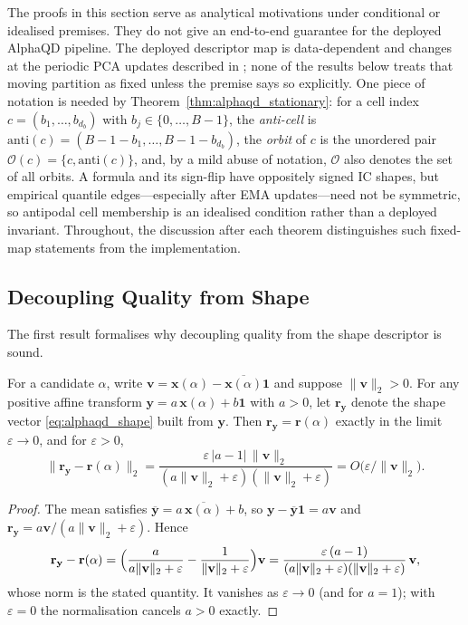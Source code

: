 The proofs in this section serve as analytical motivations under conditional or idealised premises. They do not give an end-to-end guarantee for the deployed AlphaQD pipeline. The deployed descriptor map is data-dependent and changes at the periodic PCA updates described in ; none of the results below treats that moving partition as fixed unless the premise says so explicitly. One piece of notation is needed by Theorem~\ref{thm:alphaqd_stationary}: for a cell index $c=(b_1,\dots,b_{d_b})$ with $b_j\in\{0,\dots,B-1\}$, the \emph{anti-cell} is $\mathrm{anti}(c)=(B-1-b_1,\dots,B-1-b_{d_b})$, the \emph{orbit} of $c$ is the unordered pair $\mathcal{O}(c)=\{c,\mathrm{anti}(c)\}$, and, by a mild abuse of notation, $\mathcal{O}$ also denotes the set of all orbits. A formula and its sign-flip have oppositely signed IC shapes, but empirical quantile edges---especially after EMA updates---need not be symmetric, so antipodal cell membership is an idealised condition rather than a deployed invariant. Throughout, the discussion after each theorem distinguishes such fixed-map statements from the implementation.

\subsection{Decoupling Quality from Shape}
\label{sec:alphaqd_decouple}

The first result formalises why decoupling quality from the shape descriptor is sound.

\begin{lemma}
\label{lem:alphaqd_affine}
For a candidate $\alpha$, write $\mathbf{v}=\mathbf{x}(\alpha)-\overline{\mathbf{x}(\alpha)}\mathbf{1}$ and suppose $\|\mathbf{v}\|_2>0$. For any positive affine transform $\mathbf{y}=a\,\mathbf{x}(\alpha)+b\mathbf{1}$ with $a>0$, let $\mathbf{r}_{\mathbf{y}}$ denote the shape vector \eqref{eq:alphaqd_shape} built from $\mathbf{y}$. Then $\mathbf{r}_{\mathbf{y}}=\mathbf{r}(\alpha)$ exactly in the limit $\varepsilon\to 0$, and for $\varepsilon>0$,
\[
\bigl\|\mathbf{r}_{\mathbf{y}}-\mathbf{r}(\alpha)\bigr\|_2
=\frac{\varepsilon\,|a-1|\,\|\mathbf{v}\|_2}{(a\|\mathbf{v}\|_2+\varepsilon)(\|\mathbf{v}\|_2+\varepsilon)}
=O\!\bigl(\varepsilon/\|\mathbf{v}\|_2\bigr).
\]
\end{lemma}
\begin{proof}
The mean satisfies $\overline{\mathbf{y}}=a\,\overline{\mathbf{x}(\alpha)}+b$, so $\mathbf{y}-\overline{\mathbf{y}}\mathbf{1}=a\mathbf{v}$ and $\mathbf{r}_{\mathbf{y}}=a\mathbf{v}/(a\|\mathbf{v}\|_2+\varepsilon)$. Hence
\[
\mathbf{r}_{\mathbf{y}}-\mathbf{r}(\alpha)
=\Bigl(\frac{a}{a\|\mathbf{v}\|_2+\varepsilon}-\frac{1}{\|\mathbf{v}\|_2+\varepsilon}\Bigr)\mathbf{v}
=\frac{\varepsilon\,(a-1)}{(a\|\mathbf{v}\|_2+\varepsilon)(\|\mathbf{v}\|_2+\varepsilon)}\,\mathbf{v},
\]
whose norm is the stated quantity. It vanishes as $\varepsilon\to 0$ (and for $a=1$); with $\varepsilon=0$ the normalisation cancels $a>0$ exactly.
\end{proof}

